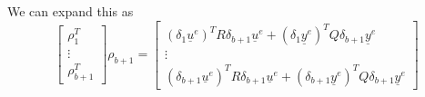 We can expand this as
\begin{equation}
    \begin{bmatrix}
        \rho_1^T \\ \vdots \\ \rho_{b+1}^T
    \end{bmatrix}
    \rho_{b+1} 
    = 
    \begin{bmatrix}
        {{\left(\delta_1 \underline{u}^e\right)}^T} R \delta_{b+1} \underline{u}^e + {{\left(\delta_1 \underline{y}^e\right)}^T} Q \delta_{b+1}\underline{y}^e \\ 
        \vdots \\ 
        {{\left(\delta_{b+1} \underline{u}^e\right)}^T} R \delta_{b+1} \underline{u}^e + {{\left(\delta_{b+1} \underline{y}^e\right)}^T} Q \delta_{b+1}\underline{y}^e 
    \end{bmatrix}
    \label{eq:b1_W_expanded}
\end{equation}

